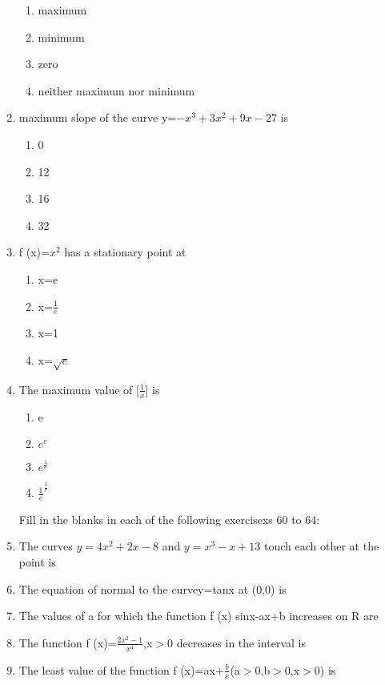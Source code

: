 \documentclass[12pt]{article}
\begin{document}
\begin{enumerate}
\begin{enumerate}
\item maximum
\item minimum
\item zero
\item neither maximum nor minimum
\end{enumerate}
\item maximum slope of the curve y=$-x^3+ 3x^2+9x-27$ is
\begin{enumerate} 
\item 0
\item 12
\item 16
\item 32 
\end{enumerate}
\item f (x)=$x^2$ has a stationary point at
\begin{enumerate}
\item x=e
\item x=$\frac{1}{e}$
\item x=1
\item x=$\sqrt{e}$
\end{enumerate}
\item The maximum value of [$\frac{1}{x}$] is
\begin{enumerate}
\item e
\item $e^e$
\item $e^\frac{1}{e}$
\item $\frac{1}{e}^\frac{1}{e}$
\end{enumerate}
Fill in the blanks in each of the following exercisexs 60 to 64:
\item The curves $y=4x^2+2x-8$ and $y=x^3-x+13$ touch each other at the point is \makebox[1cm]{\hrulefill}    
\item The equation of normal to the curvey=tanx at (0,0) is \makebox[1cm]{\hrulefill}
\item The values of a for which the function f (x) sinx-ax+b increases on R are \makebox[1cm]{\hrulefill}
\item The function f (x)=$\frac{2x^2-1}{x^4}$,x$>$0 decreases in the interval is \makebox[1cm]{\hrulefill}
\item The least value of the function f (x)=ax+$\frac{b}{x}$(a$>$0,b$>$0,x$>$0) is \makebox[1cm]{\hrulefill}
\end{enumerate}
\end{document}
